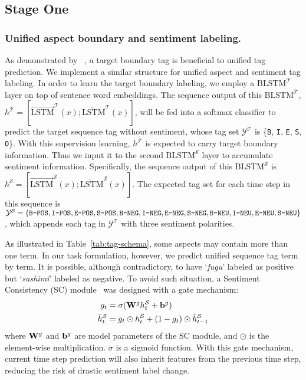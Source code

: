 \documentclass[letterpaper]{article} \usepackage{aaai20}  \usepackage{times}  \usepackage{helvet} \usepackage{courier}  \usepackage[hyphens]{url}  \usepackage{graphicx} \urlstyle{rm} \def\UrlFont{\rm}  \usepackage{graphicx}  \frenchspacing  \setlength{\pdfpagewidth}{8.5in}  \setlength{\pdfpageheight}{11in}
\newcommand{\citet}[1]
{\citeauthor{#1}~\shortcite{#1}}
\begin{document}
\subsection{Stage One} 

\subsubsection{Unified aspect boundary and sentiment labeling.}

As demonstrated by \citet{li2019unified}, a target boundary tag is beneficial to unified tag prediction. We implement a similar structure for unified aspect and sentiment tag labeling. 
In order to learn the target boundary labeling, we employ a $\text{BLSTM}^{\mathcal{T}}$ layer on top of sentence word embeddings. 
The sequence output of this $\text{BLSTM}^{\mathcal{T}}$,
$h^{\mathcal{T}} = [\overrightarrow{\text{LSTM}}^{\mathcal{T}}(x); \overleftarrow{\text{LSTM}}^{\mathcal{T}}(x)]$, 
will be fed into a softmax classifier to predict the target sequence tag without sentiment, whose tag set
$\mathcal{Y}^{\mathcal{T}}$ is \{\texttt{B}, \texttt{I}, \texttt{E}, \texttt{S}, \texttt{O}\}. With this supervision learning, 
$h^{\mathcal{T}}$ is expected to carry target boundary information. Thus we input it to the second $\text{BLSTM}^{\mathcal{S}}$ layer to accumulate sentiment information. 
Specifically, the sequence output of this $\text{BLSTM}^{\mathcal{S}}$ is $h^{\mathcal{S}} = [\overrightarrow{\text{LSTM}}^{\mathcal{S}}(x); \overleftarrow{\text{LSTM}}^{\mathcal{S}}(x)]$. The expected tag set for each time step in this sequence is $\mathcal{Y}^{\mathcal{S}} = \{\texttt{B-POS},\texttt{I-POS},\texttt{E-POS},\texttt{S-POS}, \texttt{B-NEG}, \texttt{I-NEG}, \\ \texttt{E-NEG},\texttt{S-NEG}, \texttt{B-NEU},\texttt{I-NEU},\texttt{E-NEU}, \texttt{S-NEU} \}$, which appends each tag in $\mathcal{Y}^{\mathcal{T}}$ with three sentiment polarities.

As illustrated in Table~\ref{tab:tag-schema}, some aspects may contain more than one term. In our task formulation, however, we predict unified sequence tag term by term. It is possible, although contradictory, to have `\textit{fugu}' labeled as positive but `\textit{sashimi}' labeled as negative. To avoid such situation, a Sentiment Consistency (SC) module~\cite{li2019unified} was designed with a gate mechanism:
\begin{equation}
\begin{split}
    g_t &= \sigma(\mathrm{\bf W}^g h^{\mathcal{S}}_t + \mathrm{\bf b}^g)\\
    \tilde{h}^{\mathcal{S}}_t &= g_t \odot h^{\mathcal{S}}_t + (1-g_t) \odot \tilde{h}^{\mathcal{S}}_{t-1}
    \end{split}
\end{equation}
where $\mathrm{\bf W}^g$ and $\mathrm{\bf b}^g$ are model parameters of the SC module, and $\odot$ is the element-wise multiplication. $\sigma$ is a sigmoid function. With this gate mechanism, current time step prediction will also inherit features from the previous time step, reducing the risk of drastic sentiment label change.
\end{document}
